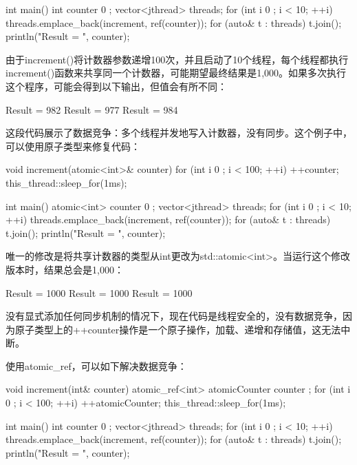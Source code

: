 \begin{cpp}
int main()
{
    int counter { 0 };
    vector<jthread> threads;
    for (int i { 0 }; i < 10; ++i) {
        threads.emplace_back(increment, ref(counter));
    }
    for (auto& t : threads) { t.join(); }
    println("Result = {}", counter);
}
\end{cpp}

由于increment()将计数器参数递增100次，并且启动了10个线程，每个线程都执行increment()函数来共享同一个计数器，可能期望最终结果是1,000。如果多次执行这个程序，可能会得到以下输出，但值会有所不同：

\begin{shell}
Result = 982
Result = 977
Result = 984
\end{shell}

这段代码展示了数据竞争：多个线程并发地写入计数器，没有同步。这个例子中，可以使用原子类型来修复代码：

\begin{cpp}
void increment(atomic<int>& counter)
{
    for (int i { 0 }; i < 100; ++i) {
        ++counter;
        this_thread::sleep_for(1ms);
    }
}

int main()
{
    atomic<int> counter { 0 };
    vector<jthread> threads;
    for (int i { 0 }; i < 10; ++i) {
        threads.emplace_back(increment, ref(counter));
    }
    for (auto& t : threads) { t.join(); }
    println("Result = {}", counter);
}
\end{cpp}

唯一的修改是将共享计数器的类型从int更改为std::atomic<int>。当运行这个修改版本时，结果总会是1,000：

\begin{shell}
Result = 1000
Result = 1000
Result = 1000
\end{shell}

没有显式添加任何同步机制的情况下，现在代码是线程安全的，没有数据竞争，因为原子类型上的++counter操作是一个原子操作，加载、递增和存储值，这无法中断。

使用atomic\_ref，可以如下解决数据竞争：

\begin{cpp}
void increment(int& counter)
{
    atomic_ref<int> atomicCounter { counter };
    for (int i { 0 }; i < 100; ++i) {
        ++atomicCounter;
        this_thread::sleep_for(1ms);
    }
}

int main()
{
    int counter { 0 };
    vector<jthread> threads;
    for (int i { 0 }; i < 10; ++i) {
        threads.emplace_back(increment, ref(counter));
    }
    for (auto& t : threads) { t.join(); }
    println("Result = {}", counter);
}
\end{cpp}

